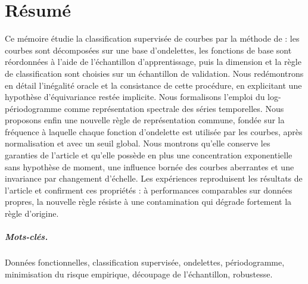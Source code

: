 \chapter*{Résumé}

Ce mémoire étudie la classification supervisée de courbes par la méthode de \citet{berlinet2008functional} : les courbes sont décomposées sur une base d'ondelettes, les fonctions de base sont réordonnées à l'aide de l'échantillon d'apprentissage, puis la dimension et la règle de classification sont choisies sur un échantillon de validation. Nous redémontrons en détail l'inégalité oracle et la consistance de cette procédure, en explicitant une hypothèse d'équivariance restée implicite. Nous formalisons l'emploi du log-périodogramme comme représentation spectrale des séries temporelles. Nous proposons enfin une nouvelle règle de représentation commune, fondée sur la fréquence à laquelle chaque fonction d'ondelette est utilisée par les courbes, après normalisation et avec un seuil global. Nous montrons qu'elle conserve les garanties de l'article et qu'elle possède en plus une concentration exponentielle sans hypothèse de moment, une influence bornée des courbes aberrantes et une invariance par changement d'échelle. Les expériences reproduisent les résultats de l'article et confirment ces propriétés : à performances comparables sur données propres, la nouvelle règle résiste à une contamination qui dégrade fortement la règle d'origine.

\paragraph{Mots-clés.} Données fonctionnelles, classification supervisée, ondelettes, périodogramme, minimisation du risque empirique, découpage de l'échantillon, robustesse.

\vspace{1cm}

